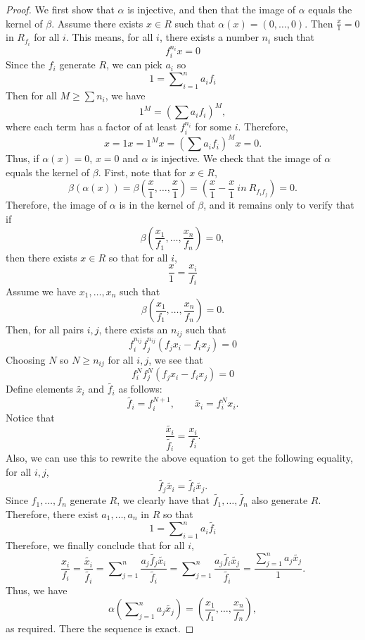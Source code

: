 \begin{proof}
We first show that $\alpha$ is injective,
and then that the image of $\alpha$ equals the kernel of $\beta$.
Assume there exists $x\in R$ such that $\alpha(x) = (0, \ldots, 0)$.
Then $\frac{x}{1} = 0$ in $R_{f_i}$ for all $i$.
This means, for all $i$, there exists a number $n_i$ such that
$$
f_i^{n_i}x = 0
$$
Since the $f_i$ generate $R$, we can pick $a_i$ so
$$
1 = \sum\nolimits_{i = 1}^n a_if_i
$$
Then for all $M\geq\sum n_i$, we have
$$
1^M = \left(\sum a_if_i\right)^M,
$$
where each term has a factor of at least $f_i^{n_i}$ for some $i$.
Therefore,
$$
x = 1x = 1^Mx = \left(\sum a_if_i\right)^Mx = 0.
$$
Thus, if $\alpha(x) = 0$, $x = 0$ and $\alpha$ is injective.
We check that the image of $\alpha$ equals the kernel of $\beta$.
First, note that for $x\in R$,
$$
\beta(\alpha(x)) =
\beta\left(\frac{x}{1}, \ldots, \frac{x}{1}\right) =
(\frac{x}{1}-\frac{x}{1}~in~R_{f_if_j}) = 0.
$$
Therefore, the image of $\alpha$ is in the kernel of $\beta$,
and it remains only to verify that if
$$
\beta\left(\frac{x_1}{f_1}, \ldots, \frac{x_n}{f_n}\right) = 0,
$$
then there exists $x\in R$ so that for all $i$,
$$
\frac{x}{1} = \frac{x_i}{f_i}
$$
Assume we have $x_1, \ldots, x_n$ such that
$$
\beta\left(\frac{x_1}{f_1}, \ldots, \frac{x_n}{f_n}\right) = 0.
$$
Then, for all pairs $i, j$, there exists an $n_{ij}$ such that
$$
f_i^{n_{ij}}f_j^{n_{ij}}(f_jx_i-f_ix_j) = 0
$$
Choosing $N$ so $N\geq n_{ij}$ for all $i, j$, we see that
$$
f_i^Nf_j^N(f_jx_i - f_ix_j) = 0
$$
Define elements $\widetilde{x_i}$ and $\widetilde{f_i}$ as follows:
$$
\widetilde{f_i} = f_i^{N + 1}, \qquad \widetilde{x_i} = f_i^N x_i.
$$
Notice that
$$
\frac{\widetilde{x_i}}{\widetilde{f_i}} = \frac{x_i}{f_i}.
$$
Also, we can use this to rewrite the above equation to get
the following equality, for all $i, j$,
$$
\widetilde{f_j}\widetilde{x_i} = \widetilde{f_i}\widetilde{x_j}.
$$
Since $f_1, \ldots, f_n$ generate $R$, we clearly have that
$\widetilde{f_1}, \ldots, \widetilde{f_n}$ also generate $R$.
Therefore, there exist $a_1, \ldots, a_n$ in $R$ so that
$$
1 = \sum\nolimits_{i = 1}^n a_i\widetilde{f_i}
$$
Therefore, we finally conclude that for all $i$,
$$
\frac{x_i}{f_i} =
\frac{\widetilde{x_i}}{\widetilde{f_i}} =
\sum\nolimits_{j = 1}^n
\frac{a_j\widetilde{f_j}\widetilde{x_i}}{\widetilde{f_i}} =
\sum\nolimits_{j = 1}^n
\frac{a_j\widetilde{f_i}\widetilde{x_j}}{\widetilde{f_i}} =
\frac{\sum_{j = 1}^na_j\widetilde{x_j}}{1}.
$$
Thus, we have
$$
\alpha\left(\sum\nolimits_{j = 1}^na_j\widetilde{x_j}\right) =
\left(\frac{x_1}{f_1}, \ldots, \frac{x_n}{f_n}\right),
$$
as required.  There the sequence is exact.
\end{proof}

